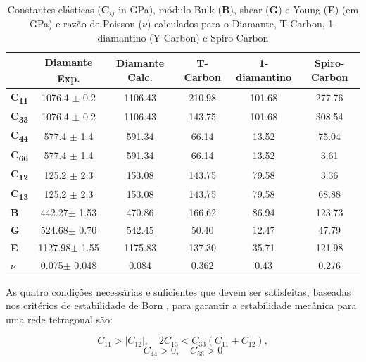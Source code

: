 	\begin{table}[ht]
		\centering
		\renewcommand{\arraystretch}{1.1}
		\caption{Constantes elásticas ($\textbf{C}_{ij}$ in GPa), módulo Bulk (\textbf{B}), shear (\textbf{G}) e Young (\textbf{E}) (em GPa) e razão de Poisson ($\nu$) calculados para o Diamante, T-Carbon, 1-diamantino (Y-Carbon) e Spiro-Carbon}
		\label{elastic}
		\begin{tabular}{lccccc}
			\hline \hline
			                             & Diamante Exp.\textsuperscript{\cite{grimsditch1975brillouin}}     &Diamante Calc. & T-Carbon & 1-diamantino & Spiro-Carbon \\\hline
			\textbf{C\textsubscript{11}} &  1076.4 $\pm$ 0.2 & 1106.43 & 210.98 & 101.68      & 277.76       \\
			\textbf{C\textsubscript{33}} &	1076.4 $\pm$ 0.2 & 1106.43 & 143.75 & 101.68      & 308.54       \\
			\textbf{C\textsubscript{44}} &  577.4 $\pm$ 1.4  & 591.34  & 66.14 & 13.52       & 75.04        \\
			\textbf{C\textsubscript{66}} &  577.4 $\pm$ 1.4  & 591.34  & 66.14 & 13.52       & 3.61         \\
			\textbf{C\textsubscript{12}} & 	125.2 $\pm$ 2.3  & 153.08  & 143.75 & 79.58       & 3.36         \\
			\textbf{C\textsubscript{13}} &	125.2 $\pm$ 2.3  & 153.08  & 143.75 & 79.58       & 68.88        \\
			\textbf{B}                   &	442.27$\pm$ 1.53 &  470.86 & 166.62 & 86.94       & 123.73       \\
			\textbf{G}                   &	524.68$\pm$ 0.70 &  542.45 & 50.40 & 12.47       & 47.79        \\
			\textbf{E}                   & 1127.98$\pm$ 1.55 & 1175.83 & 137.30 & 35.71       & 121.98       \\
			\textbf{$\nu$}               &  0.075$\pm$ 0.048 &  0.084  & 0.362 & 0.43        & 0.276        \\
			\hline \hline
		\end{tabular}
		\noindent
	\end{table}
	
	As quatro condições necessárias e suficientes que devem ser satisfeitas, baseadas nos critérios de estabilidade de Born \cite{born1940stability}, para garantir a estabilidade mecânica para uma rede tetragonal são:
	
	\begin{equation*}
	C_{11} > |C_{12}|, \quad 2C_{13} < C_{33} (C_{11} + C_{12}),
	\end{equation*}
	\begin{equation*}
	C_{44} > 0, \quad C_{66} > 0
	\end{equation*}
	
